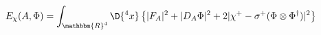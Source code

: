 \begin{equation}\label{pswa2}
 E_\chi(A,\Phi)=\int_{\mathbbm{R}^4}\D{ ^4x}\left\{|F_A|^2+
  |D_A\Phi|^2+2|\chi^+-\sigma^+(\Phi\otimes\Phi^\dagger)|^2
  \right\}
\end{equation}

